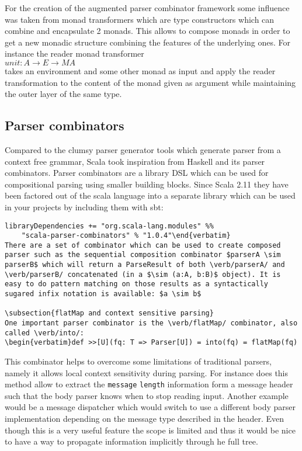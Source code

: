 For the creation of the augmented parser combinator framework some influence was taken from monad transformers which are type constructors which can combine and encapsulate 2 monads. This allows to compose monads in order to get a new monadic structure combining the features of the underlying ones. For instance the reader monad transformer\\
$unit: A \rightarrow E \rightarrow M A $\\
takes an environment and some other monad as input and apply the reader transformation to the content of the monad given as argument while maintaining the outer layer of the same type.  

\subsection{Parser combinators}
Compared to the clumsy parser generator tools which generate parser from a context free grammar, Scala took inspiration from Haskell and its parser combinators. Parser combinators are a library DSL which can be used for compositional parsing using smaller building blocks.
Since Scala 2.11 they have been factored out of the scala language into a separate library which can be used in your projects by including them with sbt:
\begin{verbatim}libraryDependencies += "org.scala-lang.modules" %%
	"scala-parser-combinators" % "1.0.4"\end{verbatim}
There are a set of combinator which can be used to create composed parser such as the sequential composition combinator $parserA \sim parserB$ which will return a ParseResult of both \verb/parserA/ and \verb/parserB/ concatenated (in a $\sim (a:A, b:B)$ object). It is easy to do pattern matching on those results as a syntactically sugared infix notation is available: $a \sim b$

\subsection{flatMap and context sensitive parsing}
One important parser combinator is the \verb/flatMap/ combinator, also called \verb/into/:
\begin{verbatim}def >>[U](fq: T => Parser[U]) = into(fq) = flatMap(fq)\end{verbatim}
This combinator helps to overcome some limitations of traditional parsers, namely it allows local context sensitivity during parsing. For instance does this method allow to extract the \verb/message/ \verb/length/ information form a message header such that the body parser knows when to stop reading input. Another example would be a message dispatcher which would switch to use a different body parser implementation depending on the message type described in the header. Even though this is a very useful feature the scope is limited and thus it would be nice to have a way to propagate information implicitly through he full tree.
